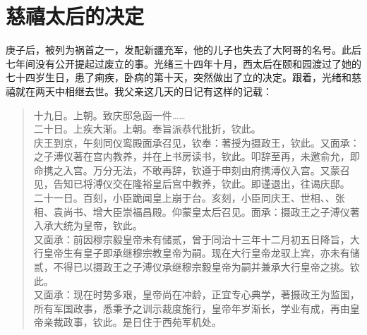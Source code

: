 \fancyhead[RO]{} %
\fancyhead[LE]{} %
\chapter*{慈禧太后的决定}
\thispagestyle{empty}
庚子后，被列为祸首之一，发配新疆充军，他的儿子也失去了大阿哥的名号。此后七年间没有公开提起过废立的事。光绪三十四年十月，西太后在颐和园渡过了她的七十四岁生日，患了痢疾，卧病的第十天，突然做出了立的决定。跟着，光绪和慈禧就在两天中相继去世。我父亲这几天的日记有这样的记载：\\

\begin{quote}
	十九日。上朝。致庆邸急函一件……\\

二十日。上疾大渐。上朝。奉旨派恭代批折，钦此。\\

庆王到京，午刻同仪鸾殿面承召见，钦奉：著授为摄政王，钦此。又面承：之子溥仪著在宫内教养，并在上书房读书，钦此。叩辞至再，未邀俞允，即命携之入宫。万分无法，不敢再辞，钦遵于申刻由府携溥仪入宫。又蒙召见，告知已将溥仪交在隆裕皇后宫中教养，钦此。即谨退出，往谒庆邸。\\

二十一日。百刻，小臣跪闻皇上崩于台。亥刻，小臣同庆王、世相、、张相、袁尚书、增大臣崇福昌殿。仰蒙皇太后召见。面承：摄政王之子溥仪著入承大统为皇帝，钦此。\\

又面承：前因穆宗毅皇帝未有储贰，曾于同治十三年十二月初五日降旨，大行皇帝生有皇子即承继穆宗教皇帝为嗣。现在大行皇帝龙驭上宾，亦未有储贰，不得已以摄政王之子溥仪承继穆宗毅皇帝为嗣并兼承大行皇帝之挑。钦此。\\

又面承：现在时势多艰，皇帝尚在冲龄，正宜专心典学，著摄政王为监国，所有军国政事，悉秉予之训示裁度施行，皇帝年岁渐长，学业有成，再由皇帝亲裁政事，钦此。是日住于西苑军机处。\\
\end{quote}

